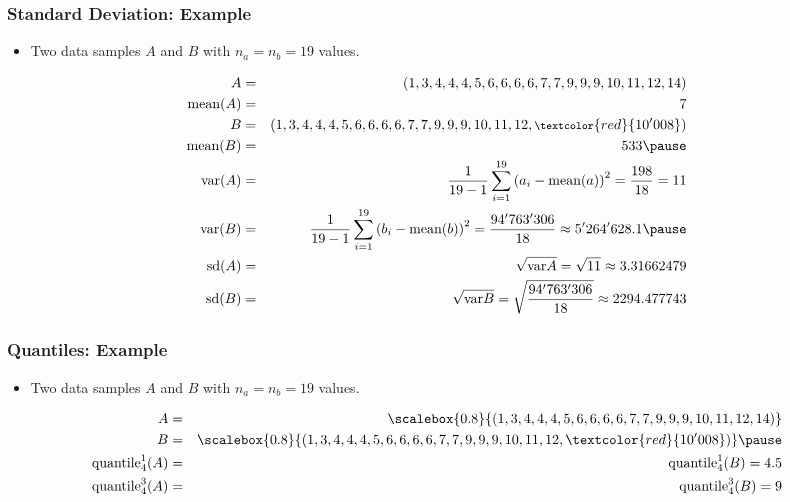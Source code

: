 \documentclass[mathserif]{beamer}%
\begin{document}
%
\begin{frame}%
\frametitle{Standard Deviation: Example}%
\begin{itemize}%
\item Two data samples $A$ and $B$ with $n_a=n_b=19$ values.%
\end{itemize}%
\begin{eqnarray}%
A &=& {\footnotesize{(1, 3, 4, 4, 4, 5, 6, 6, 6, 6, 7, 7, 9, 9, 9, 10, 11, 12, 14)}}\nonumber\\%
\mean(A)&=&7\nonumber\\%
B &=& {\footnotesize{(1, 3, 4, 4, 4, 5, 6, 6, 6, 6, 7, 7, 9, 9, 9, 10, 11, 12, \textcolor{red}{10'008})}}\nonumber\\%
\mean(B)&=&533\nonumber%
\pause\\%
\variance(A) &=& \frac{1}{19-1} \sum_{i=1}^{19}\left(a_i-\mean(a)\right)^2 = \frac{198}{18}=11\nonumber\\%
\variance(B) &=& \frac{1}{19-1} \sum_{i=1}^{19}\left(b_i-\mean(b)\right)^2 = \frac{94'763'306}{18}\approx5'264'628.1\nonumber%
\pause\\%
\stddev(A)&=&\sqrt{\variance{A}}=\sqrt{11}\approx{3.31662479}\nonumber\\%
\stddev(B)&=&\sqrt{\variance{B}}=\sqrt{\frac{94'763'306}{18}}\approx{2294.477743}\nonumber%
\end{eqnarray}%
\end{frame}%
%
\begin{frame}%
\frametitle{Quantiles: Example}%
\begin{itemize}%
\item Two data samples $A$ and $B$ with $n_a=n_b=19$ values.%
\end{itemize}%
\begin{eqnarray}%
A &=& {\scalebox{0.8}{(1, 3, 4, 4, 4, 5, 6, 6, 6, 6, 7, 7, 9, 9, 9, 10, 11, 12, 14)}}\nonumber\\%
B &=& {\scalebox{0.8}{(1, 3, 4, 4, 4, 5, 6, 6, 6, 6, 7, 7, 9, 9, 9, 10, 11, 12, \textcolor{red}{10'008})}}\nonumber%
\pause\\%
\quantile{1}{4}(A)&=&\quantile{1}{4}(B)=4.5\nonumber\\
\quantile{3}{4}(A)&=&\quantile{3}{4}(B)=9\nonumber%
\end{eqnarray}%
%
\end{frame}%
%
\end{document}
